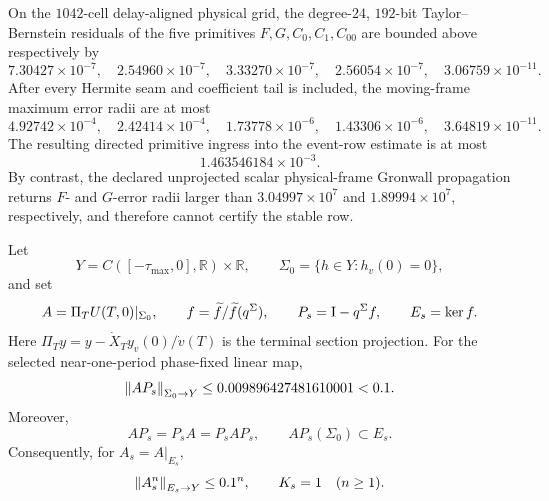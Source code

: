 \begin{proposition}
\label{prop:inner-primitive-ingress}
On the \(1042\)-cell delay-aligned physical grid, the degree-\(24\),
\(192\)-bit Taylor--Bernstein residuals of the five primitives
\(F,G,C_0,C_1,C_{00}\) are bounded above respectively by
\[
 7.30427\times10^{-7},\quad
 2.54960\times10^{-7},\quad
 3.33270\times10^{-7},\quad
 2.56054\times10^{-7},\quad
 3.06759\times10^{-11}.
\]
After every Hermite seam and coefficient tail is included, the moving-frame
maximum error radii are at most
\[
 4.92742\times10^{-4},\quad
 2.42414\times10^{-4},\quad
 1.73778\times10^{-6},\quad
 1.43306\times10^{-6},\quad
 3.64819\times10^{-11}.
\]
The resulting directed primitive ingress into the event-row estimate is at
most
\begin{equation}
 1.463546184\times10^{-3}.                             \label{eq:primitive-ingress}
\end{equation}
By contrast, the declared unprojected scalar physical-frame Gronwall
propagation returns \(F\)- and \(G\)-error radii larger than
\(3.04997\times10^7\) and \(1.89994\times10^7\), respectively, and
therefore cannot certify the stable row.
\end{proposition}

\begin{proposition}
\label{prop:inner-terminal-stable-row}
Let
\[
 Y=C([-\tau_{\max},0],\mathbb R)\times\mathbb R,
 \qquad \Sigma_0=\{h\in Y:h_v(0)=0\},
\]
and set
\[
 A=\Pi_TU(T,0)|_{\Sigma_0},\qquad
 f=\widetilde f/\widetilde f(q^\Sigma),\qquad
 P_s=\mathrm I-q^\Sigma f,\qquad E_s=\ker f.
\]
Here \(\Pi_Ty=y-\dot X_Ty_v(0)/\dot v(T)\) is the terminal section
projection.
For the selected near-one-period phase-fixed linear map,
\begin{equation}
 \left\lVert AP_s\right\rVert_{\Sigma_0\to Y}
 \le0.009896427481610001<0.1.                 \label{eq:inner-terminal-stable-row}
\end{equation}
Moreover,
\[
 AP_s=P_sA=P_sAP_s,
 \qquad AP_s(\Sigma_0)\subset E_s.
\]
Consequently, for \(A_s=A|_{E_s}\),
\begin{equation}
 \left\lVert A_s^n\right\rVert_{E_s\to Y}\le0.1^n,
 \qquad K_s=1\quad(n\ge1).                   \label{eq:inner-stable-power}
\end{equation}
\end{proposition}

